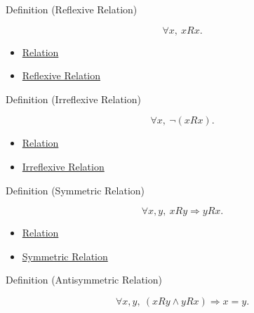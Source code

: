 \begin{definitionbox}{Definition (Reflexive Relation)}
\begin{definition}
\label{def:reflexive-relation}
\[
\forall x,\ xRx.
\]
\end{definition}
\end{definitionbox}

\begin{dependencies}
\begin{itemize}
  \item \hyperref[def:relation]{Relation}
  \item \hyperref[def:reflexive]{Reflexive Relation}
\end{itemize}
\end{dependencies}

\begin{definitionbox}{Definition (Irreflexive Relation)}
\begin{definition}
\label{def:irreflexive-relation}
\[
\forall x,\ \neg(xRx).
\]
\end{definition}
\end{definitionbox}

\begin{dependencies}
\begin{itemize}
  \item \hyperref[def:relation]{Relation}
  \item \hyperref[def:irreflexive]{Irreflexive Relation}
\end{itemize}
\end{dependencies}

\begin{definitionbox}{Definition (Symmetric Relation)}
\begin{definition}
\label{def:symmetric-relation}
\[
\forall x,y,\ xRy \Longrightarrow yRx.
\]
\end{definition}
\end{definitionbox}

\begin{dependencies}
\begin{itemize}
  \item \hyperref[def:relation]{Relation}
  \item \hyperref[def:symmetric]{Symmetric Relation}
\end{itemize}
\end{dependencies}

\begin{definitionbox}{Definition (Antisymmetric Relation)}
\begin{definition}
\label{def:antisymmetric-relation}
\[
\forall x,y,\ (xRy\land yRx)\Longrightarrow x=y.
\]
\end{definition}
\end{definitionbox}

